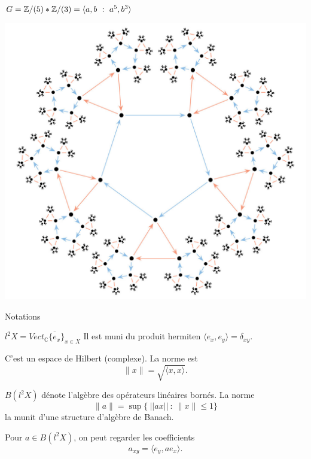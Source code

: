 \begin{frame}{$G= \Z/(5)\ast \Z/(3) = \langle a,b \ : \ a^5, b^3\rangle$}
\begin{center}
\vfill
\includegraphics[width=0.8\linewidth]{PSL2}
\vfill
\end{center}
\end{frame}



\begin{frame}{Notations} 
\begin{block}{$l^2X=\overline{Vect_{\mathbb C} \{e_x\}_{x\in X}}$}
Il est muni du produit hermiten $\langle e_x, e_y\rangle =\delta_{xy}$. 
\end{block}
C'est un espace de Hilbert (complexe). La norme est \[\|x\| =\sqrt{\langle x, x\rangle}.\]
\begin{block}{$B(l^2X)$ d\'enote l'alg\`ebre des op\'erateurs lin\'eaires born\'es. }
La norme
\[\|a\| = \sup \{\ ||ax|| \ : \ \|x\| \leq 1 \} \] 
la munit d'une structure d'alg\`ebre de Banach.
\end{block}
\vfill
Pour $a\in B(l^2 X)$, on peut regarder les coefficients \[a_{xy} = \langle e_y, ae_x \rangle .\]
\end{frame}

